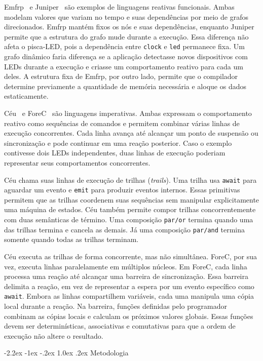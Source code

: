 \documentclass[12pt,a4paper]{article}
\makeatletter
\renewcommand\section{\@startsection{section}{1}{\z@}%
  {-2.2ex \@plus -1ex \@minus -.2ex}%
  {1.0ex \@plus .2ex}%
  {\normalfont\bfseries}}
\makeatother
\begin{document}
Emfrp~\cite{sawada2016emfrp} e Juniper~\cite{helbling2016juniper} são exemplos de linguagens reativas funcionais.
Ambas modelam valores que variam no tempo e suas dependências por meio de grafos direcionados.
Emfrp mantém fixos os nós e suas dependências, enquanto Juniper permite que a estrutura do grafo mude durante a execução.
Essa diferença não afeta o pisca-LED, pois a dependência entre \texttt{clock} e \texttt{led} permanece fixa.
Um grafo dinâmico faria diferença se a aplicação detectasse novos dispositivos com LEDs durante a execução e criasse um comportamento reativo para cada um deles.
A estrutura fixa de Emfrp, por outro lado, permite que o compilador determine previamente a quantidade de memória necessária e aloque os dados estaticamente.

Céu~\cite{santanna2015ceu} e ForeC~\cite{yip2023forec} são linguagens imperativas.
Ambas expressam o comportamento reativo como sequências de comandos e permitem combinar várias linhas de execução concorrentes.
Cada linha avança até alcançar um ponto de suspensão ou sincronização e pode continuar em uma reação posterior.
Caso o exemplo contivesse dois LEDs independentes, duas linhas de execução poderiam representar seus comportamentos concorrentes.

Céu chama suas linhas de execução de trilhas (\emph{trails}).
Uma trilha usa \texttt{await} para aguardar um evento e \texttt{emit} para produzir eventos internos.
Essas primitivas permitem que as trilhas coordenem suas sequências sem manipular explicitamente uma máquina de estados.
Céu também permite compor trilhas concorrentemente com duas semânticas de término.
Uma composição \texttt{par/or} termina quando uma das trilhas termina e cancela as demais.
Já uma composição \texttt{par/and} termina somente quando todas as trilhas terminam.

Céu executa as trilhas de forma concorrente, mas não simultânea.
ForeC, por sua vez, executa linhas paralelamente em múltiplos núcleos.
Em ForeC, cada linha processa uma reação até alcançar uma barreira de sincronização.
Essa barreira delimita a reação, em vez de representar a espera por um evento específico como \texttt{await}.
Embora as linhas compartilhem variáveis, cada uma manipula uma cópia local durante a reação.
Na barreira, funções definidas pelo programador combinam as cópias locais e calculam os próximos valores globais.
Essas funções devem ser determinísticas, associativas e comutativas para que a ordem de execução não altere o resultado.

\section{Metodologia}
\end{document}
